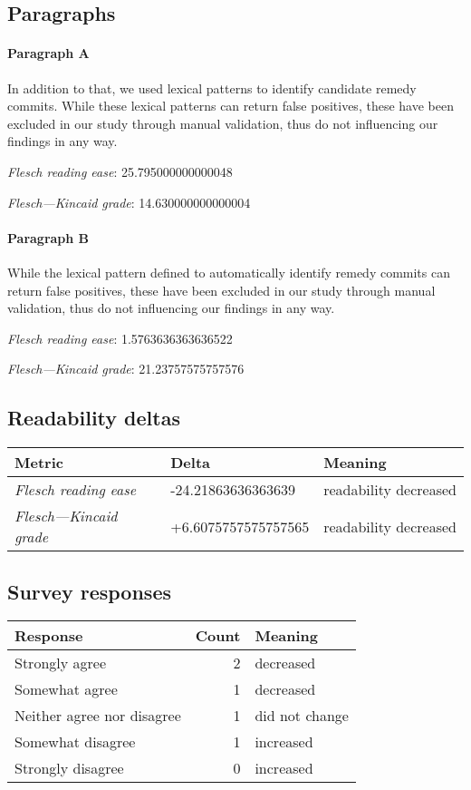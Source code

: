 \subsection{Paragraphs}
\paragraph{Paragraph A}
In addition to that, we used lexical patterns to identify candidate remedy commits. While these lexical patterns can return false positives, these have been excluded in our study through manual validation, thus do not influencing our findings in any way.\par\medskip\emph{Flesch reading ease}: 25.795000000000048\par\emph{Flesch---Kincaid grade}: 14.630000000000004

\paragraph{Paragraph B}
While the lexical pattern defined to automatically identify remedy commits can return false positives, these have been excluded in our study through manual validation, thus do not influencing our findings in any way.\par\medskip\emph{Flesch reading ease}: 1.5763636363636522\par\emph{Flesch---Kincaid grade}: 21.23757575757576

\subsection{Readability deltas}

\begin{tabular}{lll}
\toprule
               \textbf{Metric} &       \textbf{Delta} &       \textbf{Meaning} \\
\midrule
    \emph{Flesch reading ease} &   -24.21863636363639 &  readability decreased \\
 \emph{Flesch---Kincaid grade} &  +6.6075757575757565 &  readability decreased \\
\bottomrule
\end{tabular}

\subsection{Survey responses}
\begin{tabular}{lrl}
\toprule
          \textbf{Response} &  \textbf{Count} & \textbf{Meaning} \\
\midrule
             Strongly agree &               2 &        decreased \\
             Somewhat agree &               1 &        decreased \\
 Neither agree nor disagree &               1 &   did not change \\
          Somewhat disagree &               1 &        increased \\
          Strongly disagree &               0 &        increased \\
\bottomrule
\end{tabular}

